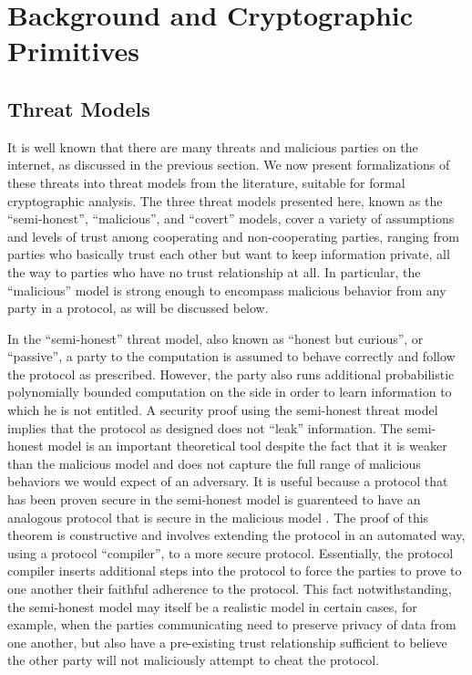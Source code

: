 
\chapter{Background and Cryptographic Primitives}


\section{Threat Models\label{sub:Threat-Models}}

It is well known that there are many threats and malicious parties
on the internet, as discussed in the previous section. We now present
formalizations of these threats into threat models from the literature,
suitable for formal cryptographic analysis. The three threat models
presented here, known as the {}``semi-honest'', {}``malicious'',
and {}``covert'' models, cover a variety of assumptions and levels
of trust among cooperating and non-cooperating parties, ranging from
parties who basically trust each other but want to keep information
private, all the way to parties who have no trust relationship at
all. In particular, the {}``malicious'' model is strong enough to
encompass malicious behavior from any party in a protocol, as will
be discussed below.

In the {}``semi-honest'' threat model, also known as {}``honest
but curious'', or {}``passive'', \cite{GMW87} a party to the computation
is assumed to behave correctly and follow the protocol as prescribed.
However, the party also runs additional probabilistic polynomially
bounded computation on the side in order to learn information to which
he is not entitled. A security proof using the semi-honest threat
model implies that the protocol as designed does not {}``leak''
information. The semi-honest model is an important theoretical tool
despite the fact that it is weaker than the malicious model and does
not capture the full range of malicious behaviors we would expect
of an adversary. It is useful because a protocol that has been proven
secure in the semi-honest model is guarenteed to have an analogous
protocol that is secure in the malicious model \cite{GMW87}. The
proof of this theorem is constructive and involves extending the protocol
in an automated way, using a protocol {}``compiler'', to a more
secure protocol. Essentially, the protocol compiler inserts additional
steps into the protocol to force the parties to prove to one another
their faithful adherence to the protocol. This fact notwithstanding,
the semi-honest model may itself be a realistic model in certain cases,
for example, when the parties communicating need to preserve privacy
of data from one another, but also have a pre-existing trust relationship
sufficient to believe the other party will not maliciously attempt
to cheat the protocol.

